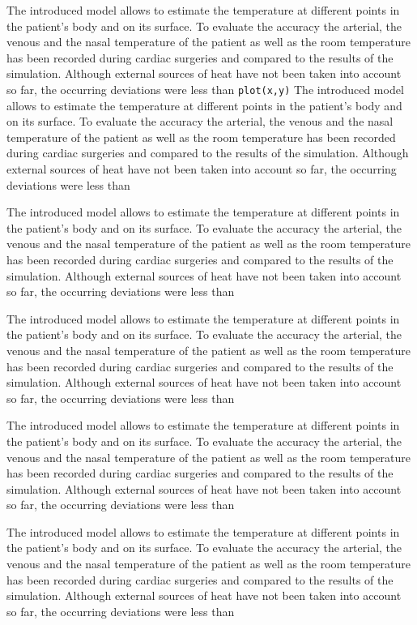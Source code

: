 

The introduced model allows to estimate the temperature at different points in the patient's body and on its surface. To evaluate the accuracy the arterial, the venous and the nasal temperature of the patient as well as the room temperature has been recorded during cardiac surgeries and compared to the results of the simulation. Although external sources of heat have not been taken into account so far, the occurring deviations were less than \lstinline!plot(x,y)! The introduced model allows to estimate the temperature at different points in the patient's body and on its surface. To evaluate the accuracy the arterial, the venous and the nasal temperature of the patient as well as the room temperature has been recorded during cardiac surgeries and compared to the results of the simulation. Although external sources of heat have not been taken into account so far, the occurring deviations were less than

The introduced model allows to estimate the temperature at different points in the patient's body and on its surface. To evaluate the accuracy the arterial, the venous and the nasal temperature of the patient as well as the room temperature has been recorded during cardiac surgeries and compared to the results of the simulation. Although external sources of heat have not been taken into account so far, the occurring deviations were less than

The introduced model allows to estimate the temperature at different points in the patient's body and on its surface. To evaluate the accuracy the arterial, the venous and the nasal temperature of the patient as well as the room temperature has been recorded during cardiac surgeries and compared to the results of the simulation. Although external sources of heat have not been taken into account so far, the occurring deviations were less than

The introduced model allows to estimate the temperature at different points in the patient's body and on its surface. To evaluate the accuracy the arterial, the venous and the nasal temperature of the patient as well as the room temperature has been recorded during cardiac surgeries and compared to the results of the simulation. Although external sources of heat have not been taken into account so far, the occurring deviations were less than

The introduced model allows to estimate the temperature at different points in the patient's body and on its surface. To evaluate the accuracy the arterial, the venous and the nasal temperature of the patient as well as the room temperature has been recorded during cardiac surgeries and compared to the results of the simulation. Although external sources of heat have not been taken into account so far, the occurring deviations were less than

